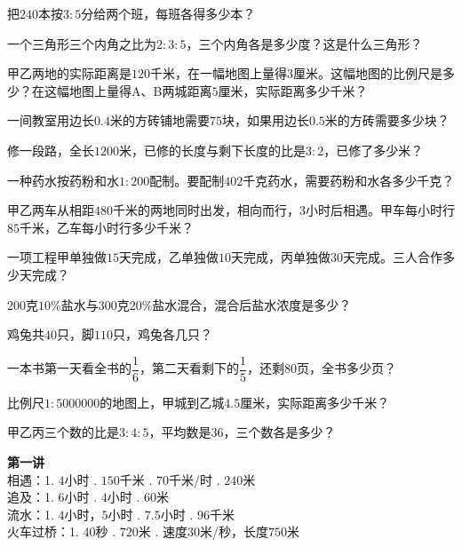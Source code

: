 \documentclass[a4paper,12pt]{ctexart}
\begin{document}
\begin{exercise}
\item 把$240$本按$3:5$分给两个班，每班各得多少本？

\item 一个三角形三个内角之比为$2:3:5$，三个内角各是多少度？这是什么三角形？

\item 甲乙两地的实际距离是$120$千米，在一幅地图上量得$3$厘米。这幅地图的比例尺是多少？在这幅地图上量得A、B两城距离$5$厘米，实际距离多少千米？

\item 一间教室用边长$0.4$米的方砖铺地需要$75$块，如果用边长$0.5$米的方砖需要多少块？

\item 修一段路，全长$1200$米，已修的长度与剩下长度的比是$3:2$，已修了多少米？

\item 一种药水按药粉和水$1:200$配制。要配制$402$千克药水，需要药粉和水各多少千克？
\end{exercise}

\newpage


\begin{exercise}
\item 甲乙两车从相距$480$千米的两地同时出发，相向而行，$3$小时后相遇。甲车每小时行$85$千米，乙车每小时行多少千米？

\item 一项工程甲单独做$15$天完成，乙单独做$10$天完成，丙单独做$30$天完成。三人合作多少天完成？

\item $200$克$10\%$盐水与$300$克$20\%$盐水混合，混合后盐水浓度是多少？

\item 鸡兔共$40$只，脚$110$只，鸡兔各几只？

\item 一本书第一天看全书的$\dfrac{1}{6}$，第二天看剩下的$\dfrac{1}{5}$，还剩$80$页，全书多少页？

\item 比例尺$1:5000000$的地图上，甲城到乙城$4.5$厘米，实际距离多少千米？

\item 甲乙丙三个数的比是$3:4:5$，平均数是$36$，三个数各是多少？
\end{exercise}

\newpage


\textbf{第一讲}
\noindent\\
相遇：1. $4$小时 . $150$千米 . $70$千米/时 . $240$米\\
追及：1. $6$小时 . $4$小时 . $60$米\\
流水：1. $4$小时，$5$小时 . $7.5$小时 . $96$千米\\
火车过桥：1. $40$秒 . $720$米 . 速度$30$米/秒，长度$750$米\\
\end{document}
